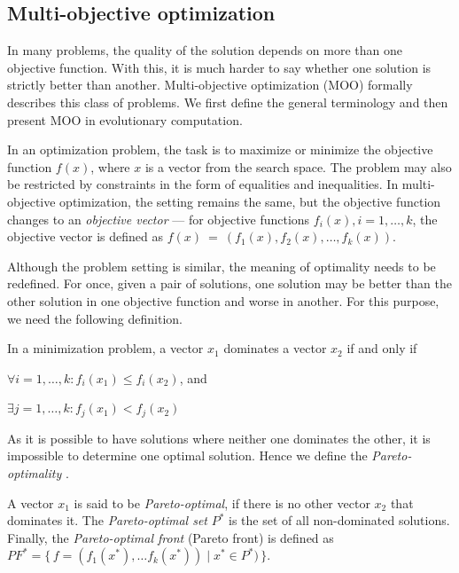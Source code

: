 \subsection{Multi-objective optimization} \label{moo}
In many problems, the quality of the solution depends on more than one
objective function. With this, it is much harder to say whether one solution
is strictly better than another. Multi-objective optimization (MOO) formally
describes this class of problems. We first define the general terminology
and then present MOO in evolutionary computation.

In an optimization problem, the task is to maximize or minimize the objective
function $f(x)$, where $x$ is a vector from the search space. The problem may
also be restricted by constraints in the form of equalities and inequalities.
In multi-objective optimization, the setting remains the same, but the
objective function changes to an \emph{objective vector} ---
for objective functions $f_i(x), i = 1,\ldots,k$, the objective vector is 
defined as $f(x)~=~(f_1(x), f_2(x), \ldots, f_k(x))$.

Although the problem setting is similar, the meaning of optimality needs to 
be redefined. For once, given a pair of solutions, one solution may be better 
than the other solution in one objective function and worse in another. For 
this purpose, we need the following definition.

\begin{definition}[Domination]
In a minimization problem, a vector $x_1$ dominates a vector $x_2$ if and 
only if 
\begin{compactitem}
\item $\forall i=1,\ldots,k: f_i(x_1) \leq f_i(x_2)$, and
\item $\exists j=1,\ldots,k: f_j(x_1) < f_j(x_2)$
\end{compactitem}
\end{definition}

As it is possible to have solutions where neither one dominates the other,
it is impossible to determine one optimal solution. Hence we define the 
\emph{Pareto-optimality}
\citep[p.~551-561,~569--573]{Engelbrecht:2007:CII:1557464}.

\begin{definition}
A vector $x_1$ is said to be \emph{Pareto-optimal}, if there is no other vector
$x_2$ that dominates it. The \emph{Pareto-optimal set} $P^*$ is the set of all
non-dominated solutions. Finally, the \emph{Pareto-optimal front} (Pareto front)
is defined as
$PF^* =\{\, f=(f_1(x^*),\ldots f_k(x^*)) \mid x^* \in P^* ) \,\}$. 
\end{definition}


